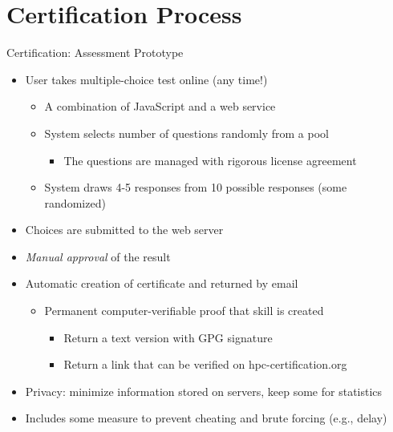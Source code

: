 \documentclass[compress,aspectratio=169]{beamer}
\begin{document}
\section{Certification Process}
\sectionIntroHidden

\begin{frame}{Certification: Assessment Prototype}
		\begin{itemize}
			\item[\color{readingRed}{1.}] User takes multiple-choice test online (any time!)
			\begin{itemize}
				\item A combination of JavaScript and a web service
				\item System selects number of questions randomly from a pool
					\begin{itemize}
						\item The questions are managed with rigorous license agreement
					\end{itemize}
				\item System draws 4-5 responses from 10 possible responses (some randomized)
			\end{itemize}
			\item[\color{readingRed}{2.}] Choices are submitted to the web server
			\item[\color{readingRed}{3.}] \textit{Manual approval} of the result
			\item[\color{readingRed}{4.}] Automatic creation of certificate and returned by email
			\begin{itemize}
							\item Permanent computer-verifiable proof that skill is created
							\begin{itemize}
								\item Return a text version with GPG signature
								\item Return a link that can be verified on hpc-certification.org
							\end{itemize}
			\end{itemize}
			\item Privacy: minimize information stored on servers, keep some for statistics
			\item Includes some measure to prevent cheating and brute forcing (e.g., delay)
		\end{itemize}
\end{frame}
\end{document}
